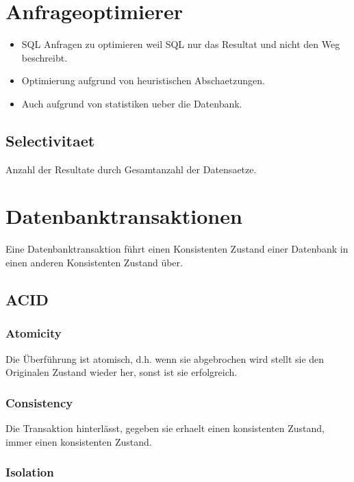 \documentclass[10pt,a4paper,oneside]{report}
\begin{document}
\section*{Anfrageoptimierer}

\begin{itemize}
\item SQL Anfragen zu optimieren weil SQL nur das Resultat und nicht den Weg beschreibt.
\item Optimierung aufgrund von heuristischen Abschaetzungen.
\item Auch aufgrund von statistiken ueber die Datenbank.
\end{itemize}

\subsection*{Selectivitaet}

Anzahl der Resultate durch Gesamtanzahl der Datensaetze.

\section*{Datenbanktransaktionen}

Eine Datenbanktransaktion führt einen Konsistenten Zustand einer Datenbank in einen anderen Konsistenten Zustand über.

\subsection*{ACID}

\subsubsection*{Atomicity}

Die Überführung ist atomisch, d.h. wenn sie abgebrochen wird stellt sie den Originalen Zustand wieder her, sonst ist sie erfolgreich.

\subsubsection*{Consistency}

Die Transaktion hinterlässt, gegeben sie erhaelt einen konsistenten Zustand, immer einen konsistenten Zustand.

\subsubsection*{Isolation}
\end{document}
